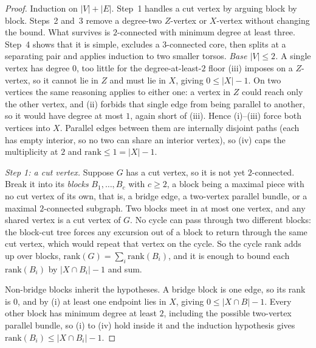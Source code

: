 \begin{proof}
Induction on $|V| + |E|$. Step~1 handles a cut vertex by arguing block by
block. Steps~2 and~3 remove a degree-two $Z$-vertex or $X$-vertex without
changing the bound. What survives is $2$-connected with minimum degree at
least three. Step~4 shows that it is simple, excludes a $3$-connected core,
then splits at a separating pair and applies induction to two smaller torsos.
\emph{Base $|V| \le 2$.} A single vertex has degree $0$, too little for the
degree-at-least-$2$ floor (iii) imposes on a $Z$-vertex, so it cannot lie in
$Z$ and must lie in $X$, giving $0 \le |X| - 1$. On two vertices the same
reasoning applies to either one: a vertex in $Z$ could reach only the other
vertex, and (ii) forbids that single edge from being parallel to another, so
it would have degree at most $1$, again short of (iii). Hence (i)--(iii)
force both vertices into $X$. Parallel edges between them are internally
disjoint paths (each has empty interior, so no two can share an interior
vertex), so (iv) caps the multiplicity at $2$ and $\mathrm{rank} \le 1 = |X| - 1$.

\emph{Step 1: a cut vertex.} Suppose $G$ has a cut vertex, so it is not yet
$2$-connected. Break it into its \emph{blocks} $B_1, \dots, B_c$ with
$c \ge 2$, a block being a maximal piece with no cut vertex of its own, that
is, a bridge edge, a two-vertex parallel bundle, or a maximal
$2$-connected subgraph. Two blocks meet in at most one vertex, and any shared vertex is a cut vertex of
$G$. No cycle can pass through two different blocks: the block-cut tree forces
any excursion out of a block to return through the same cut vertex,
which would repeat that vertex on the cycle. So the cycle rank adds
up over blocks, $\mathrm{rank}(G) = \sum_i \mathrm{rank}(B_i)$, and it is
enough to bound each $\mathrm{rank}(B_i)$ by $|X \cap B_i| - 1$ and sum.

Non-bridge blocks inherit the hypotheses. A bridge block is one edge, so its rank
is $0$, and by (i) at least one endpoint lies in $X$, giving
$0 \le |X \cap B| - 1$. Every other block has minimum degree at least $2$,
including the possible two-vertex parallel bundle, so (i) to (iv) hold inside
it and the induction hypothesis gives
$\mathrm{rank}(B_i) \le |X \cap B_i| - 1$.


\end{proof}
